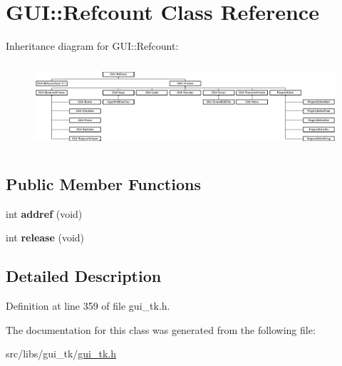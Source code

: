 \hypertarget{classGUI_1_1Refcount}{\section{G\-U\-I\-:\-:Refcount Class Reference}
\label{classGUI_1_1Refcount}
}
Inheritance diagram for G\-U\-I\-:\-:Refcount\-:\begin{figure}[H]
\begin{center}
\leavevmode
\includegraphics[height=3.211470cm]{classGUI_1_1Refcount}
\end{center}
\end{figure}
\subsection*{Public Member Functions}
\begin{DoxyCompactItemize}
\item 
\hypertarget{classGUI_1_1Refcount_a679cf0f465f267772de73fcdc9048fbd}{int {\bfseries addref} (void)}\label{classGUI_1_1Refcount_a679cf0f465f267772de73fcdc9048fbd}

\item 
\hypertarget{classGUI_1_1Refcount_a77d1468fa14a5e5e9515f7498d69c15e}{int {\bfseries release} (void)}\label{classGUI_1_1Refcount_a77d1468fa14a5e5e9515f7498d69c15e}

\end{DoxyCompactItemize}


\subsection{Detailed Description}


Definition at line 359 of file gui\-\_\-tk.\-h.



The documentation for this class was generated from the following file\-:\begin{DoxyCompactItemize}
\item 
src/libs/gui\-\_\-tk/\hyperlink{gui__tk_8h}{gui\-\_\-tk.\-h}\end{DoxyCompactItemize}
